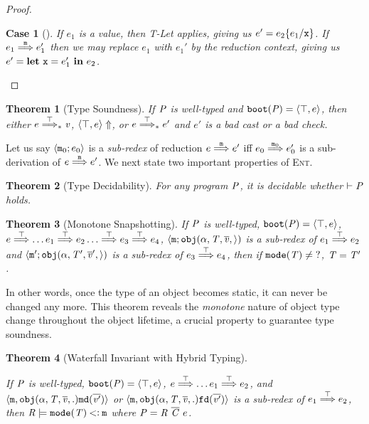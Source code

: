 \documentclass[onecolumn,nocopyrightspace]{sigplanconf}
\newtheorem{theorem}{Theorem} %
\theoremstyle{lessintrusive}
\theoremstyle{plain}
\theoremstyle{custom}
\newtheorem*{case}{Case}
\theoremstyle{subcase-custom}
\newcommand{\ourlang}{\textsc{Ent}}
\begin{document}
\begin{proof}
\begin{case}[]
If $e_1$ is a value, then T-Let applies, giving us $e' = e_2\{e_1/\mathtt{x}\}$. If $e_1\stackrel{\mathtt{m}}{\Longrightarrow}e_1'$ then we may replace $e_1$ with $e_1'$ by the reduction context, giving us $e' = \texttt{\bf let}\ \mathtt{x} = e_1'\ \texttt{\bf in}\ e_2$.

\end{case}


\end{proof}



\begin{theorem}[Type Soundness]
\label{pf:staticsoundness}
If $ \mathit{P}$ is well-typed and $\mathtt{boot}(\mathit{P}) = \langle\top,e\rangle$, then either $e \stackrel{\top}{\Longrightarrow}_{*} \mathit{v}$, $\langle\top,e\rangle \Uparrow$, or $e \stackrel{\top}{\Longrightarrow}_{*} e'$ and $e'$ is a bad cast or a bad check.
\end{theorem}

Let us say $\langle\mathtt{m}_0;e_0\rangle$ is a \emph{sub-redex} of reduction $e \stackrel{\mathtt{m}}{\Longrightarrow} e'$ iff $e_0 \stackrel{\mathtt{m}_0}{\Longrightarrow} e'_0$ is a sub-derivation of $e \stackrel{\mathtt{m}}{\Longrightarrow} e'$. We next state two important properties of \ourlang{}. 

\begin{theorem}[Type Decidability]
\label{pf:typedecidability}
For any program $\mathit{P}$, it is decidable whether $\vdash \mathit{P}$ holds.
\end{theorem} 

\begin{theorem}[Monotone Snapshotting]

If $ \mathit{P}$ is well-typed, $\mathtt{boot}(\mathit{P}) = \langle\top,e\rangle$, $e \stackrel{\top}{\Longrightarrow} \dots e_1 \stackrel{\top}{\Longrightarrow} e_2 \dots\stackrel{\top}{\Longrightarrow} e_3 \stackrel{\top}{\Longrightarrow} e_4$,  $\langle\mathtt{m}; \mathtt{obj}( \alpha, \mathit{T},\overline{\mathit{v}},\rangle)$ is a sub-redex of $e_1 \stackrel{\top}{\Longrightarrow} e_2$ and $\langle\mathtt{m}'; \mathtt{obj}( \alpha, \mathit{T}',\overline{\mathit{v}}',\rangle)$ is a sub-redex of $e_3 \stackrel{\top}{\Longrightarrow} e_4$, then if $\mathtt{mode}(\mathit{T}) \neq \mathtt{?}$, $\mathit{T} = \mathit{T}'$. 
\end{theorem}

In other words, once the type of an object becomes static, it can never be changed any more. This theorem reveals the \emph{monotone} nature of object type change throughout the object lifetime, a crucial property to guarantee type soundness. 

\begin{theorem}[Waterfall Invariant with Hybrid Typing]
\label{pf:waterfallinvariant}

If $ \mathit{P}$ is well-typed, $\mathtt{boot}(\mathit{P}) = \langle\top,e\rangle$, $e \stackrel{\top}{\Longrightarrow} \dots e_1 \stackrel{\top}{\Longrightarrow} e_2$, and $\langle\mathtt{m},\mathtt{obj}(\alpha, \mathit{T},\overline{\mathit{v}},.)\mathtt{md}(\overline{\mathit{v}'})\rangle$ or $\langle\mathtt{m},\mathtt{obj}(\alpha, \mathit{T},\overline{\mathit{v}},.)\mathtt{fd}(\overline{\mathit{v}'})\rangle$ is a sub-redex of $e_1 \stackrel{\top}{\Longrightarrow} e_2$, then $\mathit{R} \models \mathtt{mode}(\mathit{T}) \mathbin{<\vcentcolon} \mathtt{m}$ where $\programcode = \rodef \ \overline{\classes} \ e$.
\end{theorem} 
\end{document}
